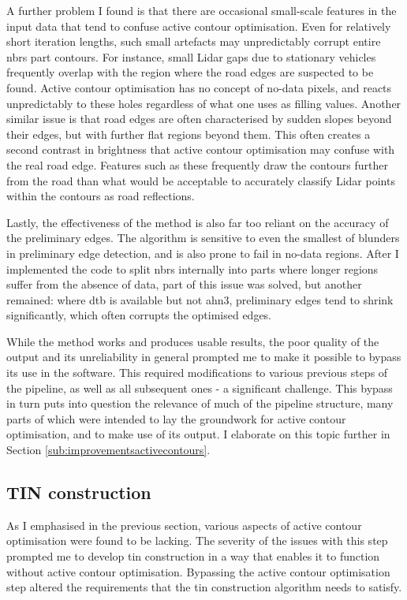 A further problem I found is that there are occasional small-scale features in the input data that tend to confuse active contour optimisation. Even for relatively short iteration lengths, such small artefacts may unpredictably corrupt entire \ac{nbrs} part contours. For instance, small Lidar gaps due to stationary vehicles frequently overlap with the region where the road edges are suspected to be found. Active contour optimisation has no concept of no-data pixels, and reacts unpredictably to these holes regardless of what one uses as filling values. Another similar issue is that road edges are often characterised by sudden slopes beyond their edges, but with further flat regions beyond them. This often creates a second contrast in brightness that active contour optimisation may confuse with the real road edge. Features such as these frequently draw the contours further from the road than what would be acceptable to accurately classify Lidar points within the contours as road reflections.

Lastly, the effectiveness of the method is also far too reliant on the accuracy of the preliminary edges. The algorithm is sensitive to even the smallest of blunders in preliminary edge detection, and is also prone to fail in no-data regions. After I implemented the code to split \ac{nbrs} internally into parts where longer regions suffer from the absence of data, part of this issue was solved, but another remained: where \ac{dtb} is available but not \ac{ahn3}, preliminary edges tend to shrink significantly, which often corrupts the optimised edges.

While the method works and produces usable results, the poor quality of the output and its unreliability in general prompted me to make it possible to bypass its use in the software. This required modifications to various previous steps of the pipeline, as well as all subsequent ones - a significant challenge. This bypass in turn puts into question the relevance of much of the pipeline structure, many parts of which were intended to lay the groundwork for active contour optimisation, and to make use of its output. I elaborate on this topic further in Section \ref{sub:improvementsactivecontours}.

\subsection{TIN construction}
\label{sub:m_tinconstruction}

As I emphasised in the previous section, various aspects of active contour optimisation were found to be lacking. The severity of the issues with this step prompted me to develop \ac{tin} construction in a way that enables it to function without active contour optimisation. Bypassing  the active contour optimisation step altered the requirements that the \ac{tin} construction algorithm needs to satisfy.

